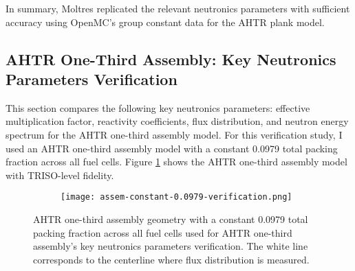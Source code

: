 In summary, Moltres replicated the relevant neutronics parameters with sufficient 
accuracy using OpenMC's group constant data for the \gls{AHTR} plank model. 
\pagebreak

\subsection{AHTR One-Third Assembly: Key Neutronics Parameters Verification}
This section compares the following key neutronics parameters: effective multiplication 
factor, reactivity coefficients, flux distribution, and neutron energy spectrum for the 
\gls{AHTR} one-third assembly model. 
For this verification study, I used an \gls{AHTR} one-third assembly model with a constant 
0.0979 total packing fraction across all fuel cells.  
Figure \ref{fig:ahtr-assem-verification} shows the \gls{AHTR} one-third assembly 
model with TRISO-level fidelity.
\begin{figure}[htbp]
    \centering
    \begin{subfigure}{.7\textwidth}
    \texttt{[image: assem-constant-0.0979-verification.png]}
    \end{subfigure}%
    \begin{subfigure}{.3\textwidth}
        \vspace{1cm}
    \end{subfigure}
    \caption{\acrfull{AHTR} one-third assembly geometry with a constant 0.0979 total packing 
    fraction across all fuel cells used for \gls{AHTR} one-third assembly's key neutronics 
    parameters verification. 
    The white line corresponds to the centerline where flux distribution is measured. }  
    \label{fig:ahtr-assem-verification}
\end{figure}

